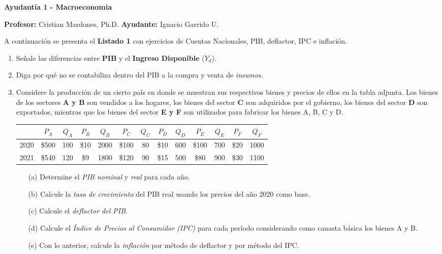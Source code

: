 \documentclass[11pt,addpoints]{article}
\begin{document}
\vspace*{0.05cm} %

\begin{center}
{\Large \bfseries Ayudantía 1 - Macroeconomia\\[0.5cm]}
\end{center}

\textbf{Profesor:} Cristian Mardones, Ph.D. \quad
\textbf{Ayudante:} Ignacio Garrido U.

\bigskip

A continuación se presenta el \textbf{Listado 1} con ejercicios de Cuentas Nacionales, PIB, deflactor, IPC e inflación.

\begin{enumerate}
\item Señale las diferencias entre \textbf{PIB} y el \textbf{Ingreso Disponible} ($Y_d$).

\item Diga por qué no se contabiliza dentro del PIB a la compra y venta de \textit{insumos}.

\item Considere la producción de un cierto país en donde se muestran sus respectivos bienes y precios de ellos en la tabla adjunta. Los bienes de los sectores \textbf{A y B} son vendidos a los hogares, los bienes del sector \textbf{C} son adquiridos por el gobierno, los bienes del sector \textbf{D} son exportados, mientras que los bienes del sector \textbf{E y F} son utilizados para fabricar los bienes A, B, C y D.
\begin{center}
\begin{tabular}{lcccccccccccc}
\hline
 & $P_A$ & $Q_A$ & $P_B$ & $Q_B$ & $P_C$ & $Q_C$ & $P_D$ & $Q_D$ & $P_E$ & $Q_E$ & $P_F$ & $Q_F$  \\
\hline
2020 & \$500 & 100 & \$10 & 2000 & \$100 & 80 & \$10 & 600 & \$100 & 700 & \$20 & 1000 \\
2021 & \$540 & 120 & \$9 & 1800 & \$120 & 90 & \$15 & 500 & \$80 & 900 & \$30 & 1100 \\
\hline
\end{tabular}

\end{center}

\begin{enumerate}
\item[(a)] Determine el \textit{PIB nominal} y \textit{real} para cada año.
\item[(b)] Calcule la \textit{tasa de crecimiento} del PIB real usando los precios del año 2020 como base.
\item[(c)] Calcule el \textit{deflactor del PIB}.
\item[(d)] Calcule el \textit{Índice de Precios al Consumidor (IPC)} para cada período considerando como canasta básica los bienes A y B.
\item[(e)] Con lo anterior, calcule la \textit{inflación} por método de deflactor y por método del IPC.
\end{enumerate}



\end{enumerate}
\end{document}
